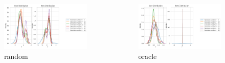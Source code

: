 \documentclass{beamer}
\begin{document}
\begin{frame}
\begin{columns}[c]
        \begin{figure}
            \centering
            \includegraphics[width=1\textwidth]{images/new_photo/random_distr.png}
             \vspace*{-9mm}\caption{random}
        \end{figure}

        \begin{figure}
            \centering
            \includegraphics[width=1\textwidth]{images/new_photo/oracle_distr.png}
             \vspace*{-9mm}\caption{oracle}
        \end{figure}

    \end{columns}
\end{frame}
\end{document}
